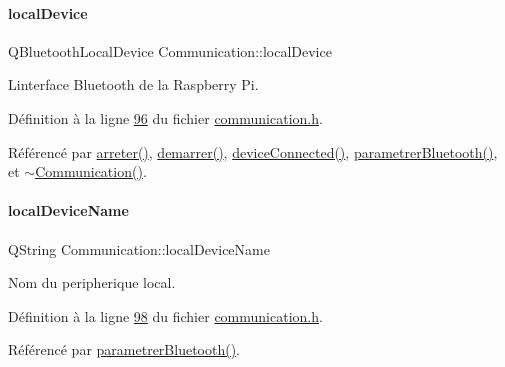 \mbox{\label{class_communication_a6281796eab7523bef6be1a766e0e906f}} 
\paragraph{\texorpdfstring{local\+Device}{localDevice}}
{\footnotesize\ttfamily Q\+Bluetooth\+Local\+Device Communication\+::local\+Device\hspace{0.3cm}{\ttfamily [private]}}



L\textquotesingle{}interface Bluetooth de la Raspberry Pi. 



Définition à la ligne \hyperlink{communication_8h_source_l00096}{96} du fichier \hyperlink{communication_8h_source}{communication.\+h}.



Référencé par \hyperlink{communication_8cpp_source_l00121}{arreter()}, \hyperlink{communication_8cpp_source_l00101}{demarrer()}, \hyperlink{communication_8cpp_source_l00329}{device\+Connected()}, \hyperlink{communication_8cpp_source_l00059}{parametrer\+Bluetooth()}, et \hyperlink{communication_8cpp_source_l00036}{$\sim$\+Communication()}.

\mbox{\label{class_communication_aa70c6b4acb921b03ffa8b8b044e87a94}} 
\paragraph{\texorpdfstring{local\+Device\+Name}{localDeviceName}}
{\footnotesize\ttfamily Q\+String Communication\+::local\+Device\+Name\hspace{0.3cm}{\ttfamily [private]}}



Nom du peripherique local. 



Définition à la ligne \hyperlink{communication_8h_source_l00098}{98} du fichier \hyperlink{communication_8h_source}{communication.\+h}.



Référencé par \hyperlink{communication_8cpp_source_l00059}{parametrer\+Bluetooth()}.

